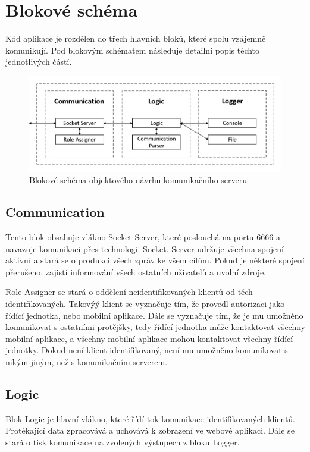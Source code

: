 \documentclass[FM,DP]{tulthesis}  %
\begin{document}
\section{Blokové schéma}
Kód aplikace je rozdělen do třech hlavních bloků, které spolu vzájemně komunikují. Pod blokovým schématem následuje detailní popis těchto jednotlivých částí.

\begin{figure}[H]
\begin{center}
\includegraphics[width=\textwidth]{vector/blokoveSchemaSecurityServer.pdf}
\caption{Blokové schéma objektového návrhu komunikačního serveru}
\label{image}
\end{center}
\end{figure}

\subsection{Communication}
Tento blok obsahuje vlákno Socket Server, které poslouchá na portu 6666 a navazuje komunikaci přes technologii Socket. Server udržuje všechna spojení aktivní a stará se o produkci všech zpráv ke všem cílům. Pokud je některé spojení přerušeno, zajistí informování všech ostatních uživatelů a uvolní zdroje. 

Role Assigner se stará o oddělení neidentifikovaných klientů od těch identifikovaných. Takovýý klient se vyznačuje tím, že provedl autorizaci jako řídící jednotka, nebo mobilní aplikace. Dále se vyznačuje tím, že je mu umožněno komunikovat s ostatními protějšky, tedy řídící jednotka může kontaktovat všechny mobilní aplikace, a všechny mobilní aplikace mohou kontaktovat všechny řídící jednotky. Dokud není klient identifikovaný, není mu umožněno komunikovat s nikým jiným, než s komunikačním serverem.

\subsection{Logic}
Blok Logic je hlavní vlákno, které řídí tok komunikace identifikovaných klientů. Protékající data zpracovává a uchovává k zobrazení ve webové aplikaci. Dále se stará o tisk komunikace na zvolených výstupech z bloku Logger.
\end{document}
